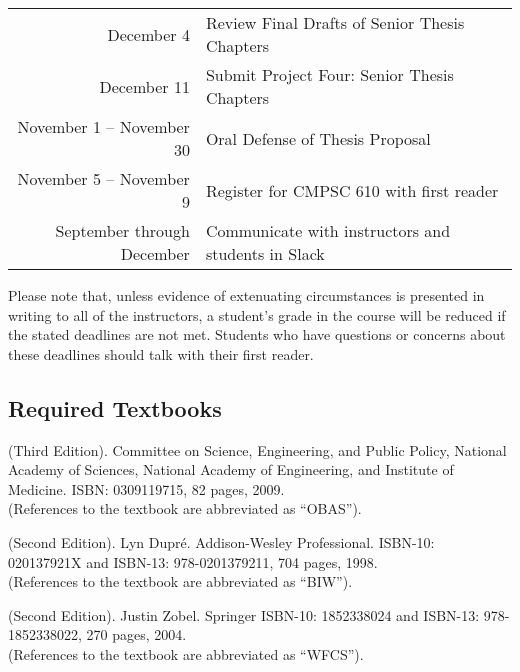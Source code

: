 \documentclass[11pt]{article}
\begin{document}
\begin{center}
\begin{longtable}{r|l}
December 4  & Review Final Drafts of Senior Thesis Chapters \\
December 11 & Submit Project Four: Senior Thesis Chapters   \\

\hline

November 1 -- November 30 & Oral Defense of Thesis Proposal          \\
November 5 -- November 9 & Register for CMPSC 610 with first reader \\

\hline

September through December & Communicate with instructors and students in Slack \\

\hline

\end{longtable}
\end{center}

\vspace*{-.25in}

\noindent Please note that, unless evidence of extenuating circumstances is presented in writing to all of the instructors, a student's grade in the course will be reduced if the stated deadlines are not met. Students who have questions or concerns about these deadlines should talk with their first reader.

\subsection*{Required Textbooks}

(Third Edition).  Committee on Science, Engineering, and Public Policy, National Academy of Sciences, National Academy of Engineering, and Institute of Medicine. ISBN: 0309119715, 82 pages, 2009.\\ (References to the textbook are abbreviated as ``OBAS'').

 (Second Edition). Lyn Dupr\'e.  Addison-Wesley Professional.  ISBN-10: 020137921X and ISBN-13: 978-0201379211, 704 pages, 1998.\\ (References to the textbook are abbreviated as ``BIW'').

 (Second Edition).  Justin Zobel. Springer ISBN-10: 1852338024 and ISBN-13: 978-1852338022, 270 pages, 2004. \\ (References to the textbook are abbreviated as ``WFCS'').
\end{document}
